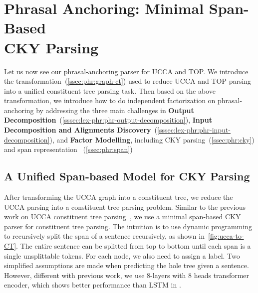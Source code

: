 \section[Phrasal Anchoring: Minimal Span-Based CKY Parsing]{Phrasal Anchoring: Minimal Span-Based \\CKY Parsing}
\label{sec:lex-phr:cky-based}

Let us now see our phrasal-anchoring parser for UCCA and TOP. We
introduce the transformation~(\autoref{ssec:phr:graph-ct}) used to
reduce UCCA and TOP parsing into a unified constituent tree parsing
task. Then based on the above transformation, we introduce how to do
independent factorization on phrasal-anchoring by addressing the three
main challenges in \textbf{Output
  Decomposition}~(\autoref{sssec:lex-phr:phr-output-decomposition}),
\textbf{Input Decomposition and Alignments
  Discovery}~(\autoref{sssec:lex-phr:phr-input-decomposition}), and
\textbf{Factor Modelling}, including CKY
parsing~(\autoref{ssec:phr:cky}) and span representation
~(\autoref{ssec:phr:span})





\subsection{A Unified Span-based Model for CKY Parsing}
\label{ssec:phr:cky}
After transforming the UCCA graph into a constituent tree, we reduce
the UCCA parsing into a constituent tree parsing problem. Similar to
the previous work on UCCA constituent tree
parsing~\cite{jiang2019hlt}, we use a minimal span-based CKY parser
for constituent tree parsing.  The intuition is to use dynamic
programming to recursively split the span of a sentence recursively,
as shown in~\autoref{fig:ucca-to-CT}. The entire sentence can be
splitted from top to bottom until each span is a single unsplittable
tokens. For each node, we also need to assign a label. Two simplified
assumptions are made when predicting the hole tree given a
sentence. However, different with previous work, we use 8-layers with
8 heads transformer encoder, which shows better performance than LSTM
in \citet{kitaev2018constituency}.

